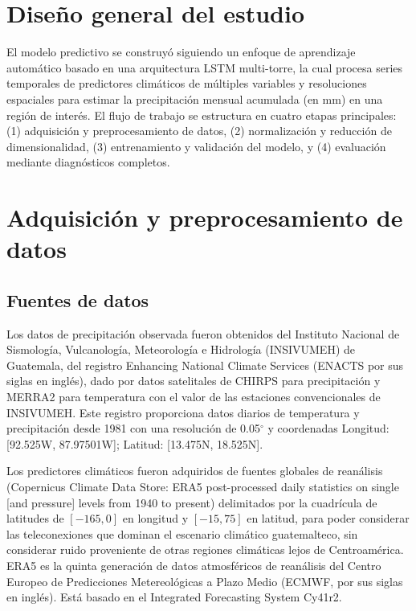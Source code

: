 \section{Diseño general del estudio}
\label{sec:disenio_general}

El modelo predictivo se construyó siguiendo un enfoque de aprendizaje automático basado en una arquitectura LSTM multi-torre, la cual procesa series temporales de predictores climáticos de múltiples variables y resoluciones espaciales para estimar la precipitación mensual acumulada (en mm) en una región de interés. El flujo de trabajo se estructura en cuatro etapas principales: (1) adquisición y preprocesamiento de datos, (2) normalización y reducción de dimensionalidad, (3) entrenamiento y validación del modelo, y (4) evaluación mediante diagnósticos completos.

\section{Adquisición y preprocesamiento de datos}
\label{sec:adquisicion_datos}

\subsection{Fuentes de datos}\label{subsec:fuentes_de_datos}
Los datos de precipitación observada fueron obtenidos del Instituto Nacional de Sismología, Vulcanología, Meteorología e Hidrología (INSIVUMEH) de Guatemala, del registro Enhancing National Climate Services (ENACTS por sus siglas en inglés), dado por datos satelitales de CHIRPS para precipitación y MERRA2 para temperatura con el valor de las estaciones convencionales de INSIVUMEH. Este registro proporciona datos diarios de temperatura y precipitación desde 1981 con una resolución de 0.05$^{\circ}$ y coordenadas Longitud: [92.525W, 87.97501W]; Latitud: [13.475N, 18.525N]. 

Los predictores climáticos fueron adquiridos de fuentes globales de reanálisis (Copernicus Climate Data Store: ERA5 post-processed daily statistics on single [and pressure] levels from 1940 to present) delimitados por la cuadrícula de latitudes de $[-165, 0]$ en longitud y $[-15, 75]$ en latitud, para poder considerar las teleconexiones que dominan el escenario climático guatemalteco, sin considerar ruido proveniente de otras regiones climáticas lejos de Centroamérica. ERA5 es la quinta generación de datos atmosféricos de reanálisis del Centro Europeo de Predicciones Metereológicas a Plazo Medio (ECMWF, por sus siglas en inglés). Está basado en el Integrated Forecasting System Cy41r2.

